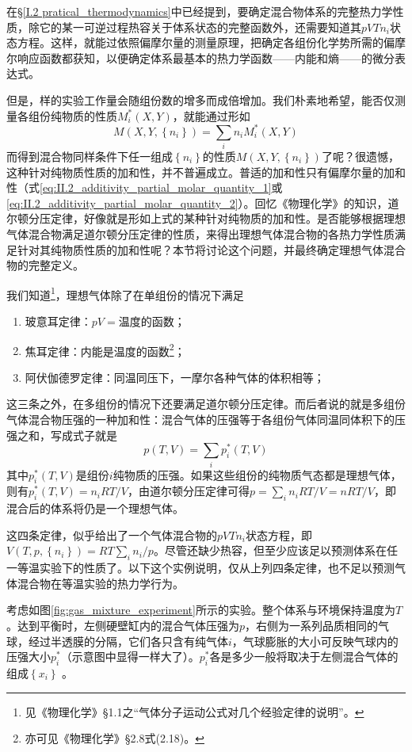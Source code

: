 \documentclass[main.tex]{subfiles}
\begin{document}
在\S\ref{I.2 pratical_thermodynamics}中已经提到，要确定混合物体系的完整热力学性质，除它的某一可逆过程热容关于体系状态的完整函数外，还需要知道其$pVTn_i$状态方程。这样，就能过依照偏摩尔量的测量原理，把确定各组份化学势所需的偏摩尔响应函数都获知，以便确定体系最基本的热力学函数——内能和熵——的微分表达式。

但是，样的实验工作量会随组份数的增多而成倍增加。我们朴素地希望，能否仅测量各组份纯物质的性质$M_i^*\left(X,Y\right)$，就能通过形如
\[M\left(X,Y,\left\{n_i\right\}\right)=\sum_i n_i M_i^*\left(X,Y\right)\]
而得到混合物同样条件下任一组成$\left\{n_i\right\}$的性质$M\left(X,Y,\left\{n_i\right\}\right)$了呢？很遗憾，这种针对纯物质性质的加和性，并不普遍成立。普适的加和性只有偏摩尔量的加和性（式\eqref{eq:II.2_additivity_partial_molar_quantity_1}或\eqref{eq:II.2_additivity_partial_molar_quantity_2}）。回忆《物理化学》的知识，道尔顿分压定律，好像就是形如上式的某种针对纯物质的加和性。是否能够根据理想气体混合物满足道尔顿分压定律的性质，来得出理想气体混合物的各热力学性质满足针对其纯物质性质的加和性呢？本节将讨论这个问题，并最终确定理想气体混合物的完整定义。

我们知道\footnote{见《物理化学》\S1.1之“气体分子运动公式对几个经验定律的说明”。}，理想气体除了在单组份的情况下满足
\begin{enumerate}
    \item 玻意耳定律：$pV=\text{温度的函数}$；
    \item 焦耳定律：内能是温度的函数\footnote{亦可见《物理化学》\S 2.8式(2.18)。}；
    \item 阿伏伽德罗定律：同温同压下，一摩尔各种气体的体积相等；
\end{enumerate}
这三条之外，在多组份的情况下还要满足道尔顿分压定律。而后者说的就是多组份气体混合物压强的一种加和性：混合气体的压强等于各组份气体同温同体积下的压强之和，写成式子就是
\[p\left(T,V\right)=\sum_i p^*_i\left(T,V\right)\]
其中$p_i^*\left(T,V\right)$是组份$i$纯物质的压强。如果这些组份的纯物质气态都是理想气体，则有$p_i^*\left(T,V\right)=n_iRT/V$，由道尔顿分压定律可得$p=\sum_in_iRT/V=nRT/V$，即混合后的体系将仍是一个理想气体。

这四条定律，似乎给出了一个气体混合物的$pVTn_i$状态方程，即$V\left(T,p,\left\{n_i\right\}\right)=RT\sum_in_i/p$。尽管还缺少热容，但至少应该足以预测体系在任一等温实验下的性质了。以下这个实例说明，仅从上列四条定律，也不足以预测气体混合物在等温实验的热力学行为。

考虑如图\ref{fig:gas_mixture_experiment}所示的实验。整个体系与环境保持温度为$T$。达到平衡时，左侧硬壁缸内的混合气体压强为$p$，右侧为一系列品质相同的气球，经过半透膜的分隔，它们各只含有纯气体$i$，气球膨胀的大小可反映气球内的压强大小$p^*_i$（示意图中显得一样大了）。$p^*_i$各是多少一般将取决于左侧混合气体的组成$\left\{x_i\right\}$ 。
\end{document}
